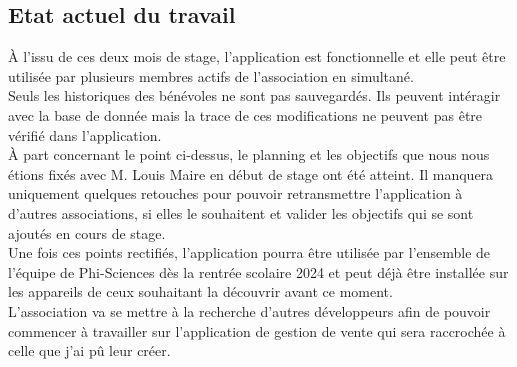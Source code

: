 \documentclass[11pt, twoside]{article}
\begin{document}
\subsection{Etat actuel du travail}
À l'issu de ces deux mois de stage, l'application est fonctionnelle et elle peut être utilisée par plusieurs membres actifs de l'association en simultané.\\
Seuls les historiques des bénévoles ne sont pas sauvegardés. 
Ils peuvent intéragir avec la base de donnée mais la trace de ces modifications ne peuvent pas être vérifié dans l'application.
\vspace*{0.2cm}\\
À part concernant le point ci-dessus, le planning et les objectifs que nous nous étions fixés avec M. Louis Maire en début de stage ont été atteint.
Il manquera uniquement quelques retouches pour pouvoir retransmettre l'application à d'autres associations, si elles le souhaitent et valider les objectifs qui se sont ajoutés en cours de stage.\\
Une fois ces points rectifiés, l'application pourra être utilisée par l'ensemble de l'équipe de Phi-Sciences dès la rentrée scolaire 2024 et peut déjà être installée sur les appareils de ceux souhaitant la découvrir avant ce moment.
\vspace*{0.2cm}\\
L'association va se mettre à la recherche d'autres développeurs afin de pouvoir commencer à travailler sur l'application de gestion de vente qui sera raccrochée à celle que j'ai pû leur créer.
\newpage
\end{document}
